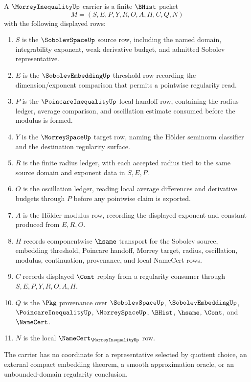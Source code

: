 \begin{definition}
\label{def:morrey-inequality-carrier}
A $\MorreyInequalityUp$ carrier is a finite $\BHist$ packet
$$
M=(S,E,P,Y,R,O,A,H,C,Q,N)
$$
with the following displayed rows:
\begin{enumerate}
\item $S$ is the $\SobolevSpaceUp$ source row, including the named domain, integrability exponent, weak derivative budget, and admitted Sobolev representative.
\item $E$ is the $\SobolevEmbeddingUp$ threshold row recording the dimension/exponent comparison that permits a pointwise regularity read.
\item $P$ is the $\PoincareInequalityUp$ local handoff row, containing the radius ledger, average comparison, and oscillation estimate consumed before the modulus is formed.
\item $Y$ is the $\MorreySpaceUp$ target row, naming the Hölder seminorm classifier and the destination regularity surface.
\item $R$ is the finite radius ledger, with each accepted radius tied to the same source domain and exponent data in $S,E,P$.
\item $O$ is the oscillation ledger, reading local average differences and derivative budgets through $P$ before any pointwise claim is exported.
\item $A$ is the Hölder modulus row, recording the displayed exponent and constant produced from $E,R,O$.
\item $H$ records componentwise $\hsame$ transport for the Sobolev source, embedding threshold, Poincare handoff, Morrey target, radius, oscillation, modulus, continuation, provenance, and local NameCert rows.
\item $C$ records displayed $\Cont$ replay from a regularity consumer through $S,E,P,Y,R,O,A,H$.
\item $Q$ is the $\Pkg$ provenance over $\SobolevSpaceUp$, $\SobolevEmbeddingUp$, $\PoincareInequalityUp$, $\MorreySpaceUp$, $\BHist$, $\hsame$, $\Cont$, and $\NameCert$.
\item $N$ is the local $\NameCert_{\MorreyInequalityUp}$ row.
\end{enumerate}
The carrier has no coordinate for a representative selected by quotient choice, an external compact embedding theorem, a smooth approximation oracle, or an unbounded-domain regularity conclusion.
\end{definition}

